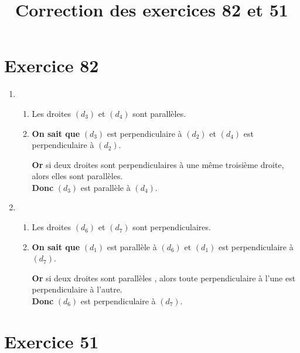 \documentclass[12pt,a4paper]{article}
\title{Correction des exercices 82 et 51}
\date{}
\begin{document}
	
	\maketitle
	
	\section*{Exercice 82}
	\begin{enumerate}[label=\arabic*)]
		\item \begin{enumerate}[label=\alph*)]
			\item Les droites $(d_3)$ et $(d_4)$ sont parallèles.
			
			\item 
			\textbf{On sait que} $(d_3)$ est perpendiculaire à $(d_2)$ et $(d_4)$ est perpendiculaire à $(d_2)$. %
			
			\textbf{Or} si deux droites sont perpendiculaires à une même troisième droite, alors elles sont parallèles.\\
			\textbf{Donc} $(d_3)$ est parallèle à $(d_4)$. %
		\end{enumerate}
	
	
		\item \begin{enumerate}[label=\alph*)]
			\item Les droites $(d_6)$ et $(d_7)$ sont perpendiculaires.
			
			\item 
			\textbf{On sait que} $(d_1)$ est parallèle à $(d_6)$ et $(d_1)$ est perpendiculaire à $(d_7)$. %
			
			\textbf{Or} si deux droites sont parallèles , alors toute perpendiculaire à l'une est perpendiculaire à l'autre.\\
			\textbf{Donc} $(d_6)$ est perpendiculaire à $(d_7)$. %
		\end{enumerate}
	\end{enumerate}

	\section*{Exercice 51}
	
\end{document}
